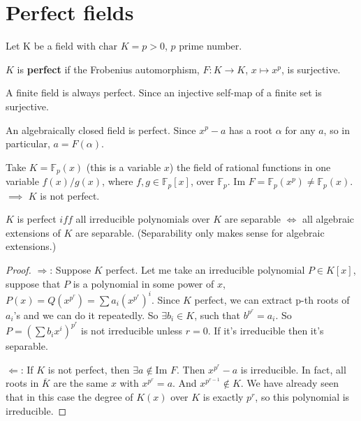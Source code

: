 \section{Perfect fields}

Let K be a field with $\text{char }K=p>0$, $p$ prime number. 

\begin{definition}
$K$ is \textbf{perfect} if the Frobenius automorphism, $F:K\to K$, $x \mapsto x^p$, is surjective.
\end{definition}

\begin{example}
A finite field is always perfect. Since an injective self-map of a finite set is surjective.
\end{example}

\begin{example}
An algebraically closed field is perfect. Since $x^p-a$ has a root $\alpha$ for any $a$, so in particular, $a=F(\alpha)$.
\end{example}

\begin{example}
Take $K=\mathbb{F}_p(x)$ (this is a variable $x$) the field of rational functions in one variable $f(x)/g(x)$, where $f,g\in\mathbb{F}_p[x]$, over $\mathbb{F}_p$. $\text{Im }F= \mathbb{F}_p(x^p)\neq \mathbb{F}_p(x)$. $\implies$ $K$ is not perfect.
\end{example}

\begin{theorem}
$K$ is perfect $iff$ all irreducible polynomials over $K$ are separable $\iff$ all algebraic extensions of $K$ are separable. (Separability only makes sense for algebraic extensions.)
\end{theorem}

\begin{proof}
$\Rightarrow$: Suppose $K$ perfect. Let me take an irreducible polynomial $P\in K[x]$, suppose that $P$ is a polynomial in some power of $x$, $P(x)=Q(x^{p^r})=\sum a_i (x^{p^r})^i$. Since $K$ perfect, we can extract p-th roots of $a_i$'s and we can do it repeatedly. So $\exists b_i \in K$, such that $b^{p^r} = a_i$. So $P=(\sum b_i x^i)^{p^r}$ is not irreducible unless $r = 0$. If it's irreducible then it's separable. 

$\Leftarrow$: If $K$ is not perfect, then $\exists a\notin \text{Im }F$. Then $x^{p^r} - a$ is irreducible. In fact, all roots in $\overbar{K}$ are the same $x$ with $x^{p^r} = a$. And $x^{p^{r-1}}\notin K$. We have already seen that in this case the degree of $K(x)$ over $K$ is exactly $p^r$, so this polynomial is irreducible. 
\end{proof}
